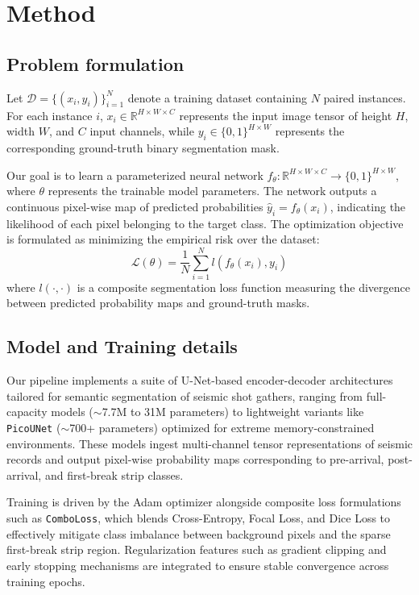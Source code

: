 \documentclass[conference]{IEEEtran}
\begin{document}
\section{Method}

\subsection{Problem formulation}
Let $\mathcal{D} = \{ (x_i, y_i) \}_{i=1}^{N}$ denote a training dataset containing $N$ paired instances. For each instance $i$, $x_i \in \mathbb{R}^{H \times W \times C}$ represents the input image tensor of height $H$, width $W$, and $C$ input channels, while $y_i \in \{0,1\}^{H \times W}$ represents the corresponding ground-truth binary segmentation mask.

Our goal is to learn a parameterized neural network $f_\theta: \mathbb{R}^{H \times W \times C} \to \{0,1\}^{H \times W}$, where $\theta$ represents the trainable model parameters. The network outputs a continuous pixel-wise map of predicted probabilities $\hat{y}_i = f_\theta(x_i)$, indicating the likelihood of each pixel belonging to the target class. The optimization objective is formulated as minimizing the empirical risk over the dataset:
\begin{equation}
\mathcal{L}(\theta) = \frac{1}{N} \sum_{i=1}^{N} l(f_\theta(x_i), y_i)
\end{equation}
where $l(\cdot,\cdot)$ is a composite segmentation loss function measuring the divergence between predicted probability maps and ground-truth masks.

\subsection{Model and Training details}
Our pipeline implements a suite of U-Net-based encoder-decoder architectures tailored for semantic segmentation of seismic shot gathers, ranging from full-capacity models ($\sim$7.7M to 31M parameters) to lightweight variants like \texttt{PicoUNet} ($\sim$700+ parameters) optimized for extreme memory-constrained environments. These models ingest multi-channel tensor representations of seismic records and output pixel-wise probability maps corresponding to pre-arrival, post-arrival, and first-break strip classes.

Training is driven by the Adam optimizer alongside composite loss formulations such as \texttt{ComboLoss}, which blends Cross-Entropy, Focal Loss, and Dice Loss to effectively mitigate class imbalance between background pixels and the sparse first-break strip region. Regularization features such as gradient clipping and early stopping mechanisms are integrated to ensure stable convergence across training epochs.
\end{document}
